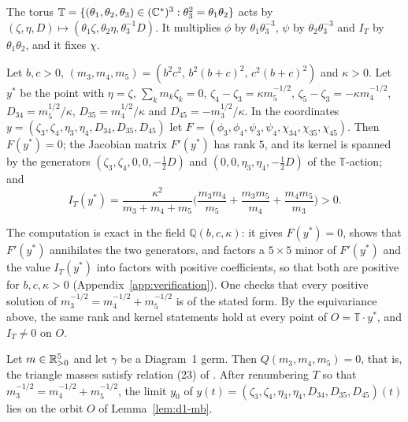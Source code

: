 The torus $\mathbb T=\{(\theta_1,\theta_2,\theta_3)\in(\mathbb{C}^*)^3:\theta_3^2=\theta_1\theta_2\}$ acts by
$(\zeta,\eta,D)\mapsto(\theta_1\zeta,\theta_2\eta,\theta_3^{-1}D)$.  It multiplies $\phi$ by
$\theta_1\theta_3^{-3}$, $\psi$ by $\theta_2\theta_3^{-3}$ and $I_T$ by $\theta_1\theta_2$, and it
fixes $\chi$.

\begin{lemma}\label{lem:d1-mb}
Let $b,c>0$, $(m_3,m_4,m_5)=(b^2c^2,\,b^2(b+c)^2,\,c^2(b+c)^2)$ and $\kappa>0$.  Let $y^*$ be the
point with $\eta=\zeta$, $\sum_km_k\zeta_k=0$, $\zeta_4-\zeta_3=\kappa m_5^{-1/2}$,
$\zeta_5-\zeta_3=-\kappa m_4^{-1/2}$, $D_{34}=m_5^{1/2}/\kappa$, $D_{35}=m_4^{1/2}/\kappa$ and
$D_{45}=-m_3^{1/2}/\kappa$.  In the coordinates $y=(\zeta_3,\zeta_4,\eta_3,\eta_4,D_{34},D_{35},
D_{45})$ let $F=(\phi_3,\phi_4,\psi_3,\psi_4,\chi_{34},\chi_{35},\chi_{45})$.  Then $F(y^*)=0$; the
Jacobian matrix $F'(y^*)$ has rank $5$, and its kernel is spanned by the generators
$(\zeta_3,\zeta_4,0,0,-\frac12D)$ and $(0,0,\eta_3,\eta_4,-\frac12D)$ of the $\mathbb T$-action; and
\[
  I_T(y^*)=\frac{\kappa^2}{m_3+m_4+m_5}\Big(\frac{m_3m_4}{m_5}+\frac{m_3m_5}{m_4}
  +\frac{m_4m_5}{m_3}\Big)>0 .
\]
\end{lemma}
The computation is exact in the field $\mathbb Q(b,c,\kappa)$: it gives $F(y^*)=0$, shows that
$F'(y^*)$ annihilates the two generators, and factors a $5\times5$ minor of $F'(y^*)$ and the
value $I_T(y^*)$ into factors with positive coefficients, so that both are positive for
$b,c,\kappa>0$ (Appendix~\ref{app:verification}).  One checks that every positive solution of
$m_3^{-1/2}=m_4^{-1/2}+m_5^{-1/2}$ is of the stated form.
By the equivariance above, the same rank and kernel statements hold at every point of
$O=\mathbb T\cdot y^*$, and $I_T\ne0$ on $O$.

\begin{proposition}\label{prop:d1-first}
Let $m\in\mathbb{R}_{>0}^5$ and let $\gamma$ be a Diagram~1 germ.  Then $Q(m_3,m_4,m_5)=0$, that is, the
triangle masses satisfy relation (23) of \cite[\S8.1]{AK}.  After renumbering $T$ so that
$m_3^{-1/2}=m_4^{-1/2}+m_5^{-1/2}$, the limit $y_0$ of
$y(t)=(\zeta_3,\zeta_4,\eta_3,\eta_4,D_{34},D_{35},D_{45})(t)$ lies on the orbit $O$ of
Lemma~\ref{lem:d1-mb}.
\end{proposition}

